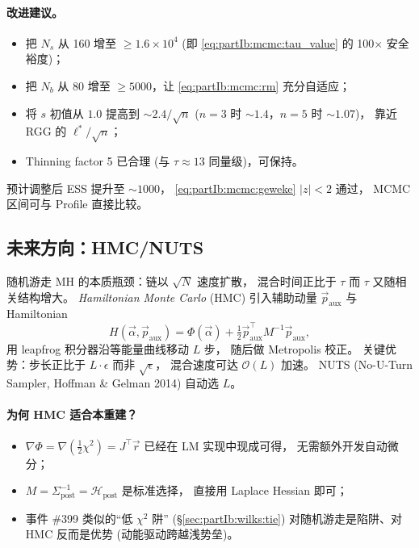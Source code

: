 \paragraph{改进建议。}
\begin{itemize}[leftmargin=2em]
  \item 把 $N_s$ 从 160 增至 $\geq 1.6\times 10^4$ 
        (即 \eqref{eq:partIb:mcmc:tau_value} 的 100$\times$ 安全裕度)；
  \item 把 $N_b$ 从 80 增至 $\geq 5000$，让 \eqref{eq:partIb:mcmc:rm} 充分自适应；
  \item 将 $s$ 初值从 $1.0$ 提高到 $\sim 2.4/\sqrt{n}$
        ($n\!=\!3$ 时 $\sim 1.4$，$n\!=\!5$ 时 $\sim 1.07$)，
        靠近 RGG 的 $\ell^{*}/\sqrt{n}$；
  \item Thinning factor 5 已合理 (与 $\tau\approx 13$ 同量级)，可保持。
\end{itemize}
预计调整后 ESS 提升至 $\sim 1000$，
\eqref{eq:partIb:mcmc:geweke} $|z|<2$ 通过，
MCMC 区间可与 Profile 直接比较。

\subsection{未来方向：HMC/NUTS}
\label{sec:partIb:mcmc:hmc}

随机游走 MH 的本质瓶颈：链以 $\sqrt{N}$ 速度扩散，
混合时间正比于 $\tau$ 而 $\tau$ 又随相关结构增大。
\emph{Hamiltonian Monte Carlo} (HMC) 引入辅助动量 $\vec p_{\mathrm{aux}}$
与 Hamiltonian
\begin{equation}
  H(\vec\alpha,\vec p_{\mathrm{aux}})
  =\Phi(\vec\alpha)+\tfrac12\vec p_{\mathrm{aux}}^{\top}M^{-1}\vec p_{\mathrm{aux}},
  \label{eq:partIb:mcmc:hamilton}
\end{equation}
用 leapfrog 积分器沿等能量曲线移动 $L$ 步，
随后做 Metropolis 校正。
关键优势：步长正比于 $L\cdot\epsilon$ 而非 $\sqrt{\epsilon}$，
混合速度可达 $\mathcal O(L)$ 加速。
NUTS (No-U-Turn Sampler, Hoffman \& Gelman 2014) 自动选 $L$。

\paragraph{为何 HMC 适合本重建？}
\begin{itemize}[leftmargin=2em]
  \item $\nabla\Phi=\nabla(\tfrac12\chi^2)=J^{\top}\vec r$ 已经在 LM 实现中现成可得，
        无需额外开发自动微分；
  \item $M=\Sigma_{\mathrm{post}}^{-1}=\mathcal H_{\mathrm{post}}$ 是标准选择，
        直接用 Laplace Hessian 即可；
  \item 事件 \#399 类似的“低 $\chi^2$ 阱” (§\ref{sec:partIb:wilks:tie}) 
        对随机游走是陷阱、对 HMC 反而是优势 (动能驱动跨越浅势垒)。
\end{itemize}

